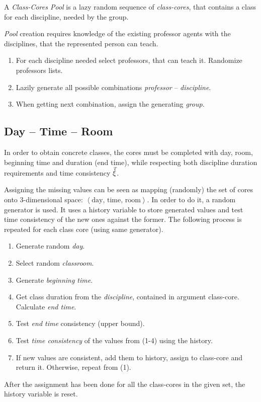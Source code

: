 \documentclass[../../ThesisDoc]{subfiles}
\begin{document}
A \emph{Class-Cores Pool} is a lazy random sequence of \emph{class-cores},
that contains a class for each discipline, needed by the group.

\emph{Pool} creation requires knowledge of the existing professor agents with
the disciplines, that the represented person can teach.
\begin{enumerate}
  \item For each discipline needed select professors, that can teach it.
        Randomize professors lists.
  \item Lazily generate all possible combinations \emph{professor} -- \emph{discipline}.
  \item When getting next combination, assign the generating \emph{group}.
\end{enumerate}

\subsection{Day -- Time -- Room}
\label{sec:solution-DTR}

In order to obtain concrete classes, the cores must be completed with day, room,
beginning time and duration (end time), while respecting both discipline duration
requirements and time consistency $\accentset{T}{\xi}$.

Assigning the missing values can be seen as mapping (randomly) the set of cores onto
3-dimensional space: $\left< \text{day, time, room} \right>$.
In order to do it, a random generator is used. It uses a history variable to
store generated values and test time consistency of the new ones against the former.
The following process is repeated for each class core (using same generator).
\begin{enumerate}
  \item Generate random \emph{day}.
  \item Select random \emph{classroom}.
  \item Generate \emph{beginning time}.
  \item Get class duration from the \emph{discipline}, contained in argument class-core.
        Calculate \emph{end time}.
  \item Test \emph{end time} consistency (upper bound).
  \item Test \emph{time consistency} of the values from (1-4) using the history.
  \item If new values are consistent, add them to history, assign to class-core
        and return it.
        Otherwise, repeat from (1).

\end{enumerate}
After the assignment has been done for all the class-cores in the given set,
the history variable is reset.
\end{document}
